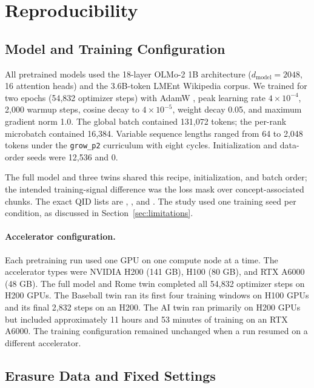 \section{Reproducibility}
\label{app:reproducibility}

\subsection{Model and Training Configuration}

All pretrained models used the 18-layer OLMo-2 1B architecture ($d_{\mathrm{model}}=
2048$, 16 attention heads) and the 3.6B-token LMEnt Wikipedia corpus. We
trained for two epochs (54,832 optimizer steps) with AdamW
\citep{loshchilov2019decoupled}, peak learning rate
$4\times10^{-4}$, 2,000 warmup steps, cosine decay to $4\times10^{-5}$,
weight decay 0.05, and maximum gradient norm 1.0. The global batch contained
131,072 tokens; the per-rank microbatch contained 16,384. Variable sequence
lengths ranged from 64 to 2,048 tokens under the \texttt{grow\_p2} curriculum
with eight cycles. Initialization and data-order seeds were 12,536 and 0.

The full model and three twins shared this recipe, initialization, and batch
order; the intended training-signal difference was the loss mask over
concept-associated chunks. The exact QID lists are
,
, and
. The study used one training seed per
condition, as discussed in Section~\ref{sec:limitations}.

\paragraph{Accelerator configuration.}
Each pretraining run used one GPU on one compute node at a time. The accelerator
types were NVIDIA H200 (141 GB), H100 (80 GB), and RTX A6000 (48 GB). The full
model and Rome twin completed all 54,832 optimizer steps on H200 GPUs. The
Baseball twin ran its first four training windows on H100 GPUs and its final
2,832 steps on an H200. The AI twin ran primarily on H200 GPUs but included
approximately 11 hours and 53 minutes of training on an RTX A6000. The training
configuration remained unchanged when a run resumed on a different
accelerator.

\subsection{Erasure Data and Fixed Settings}


